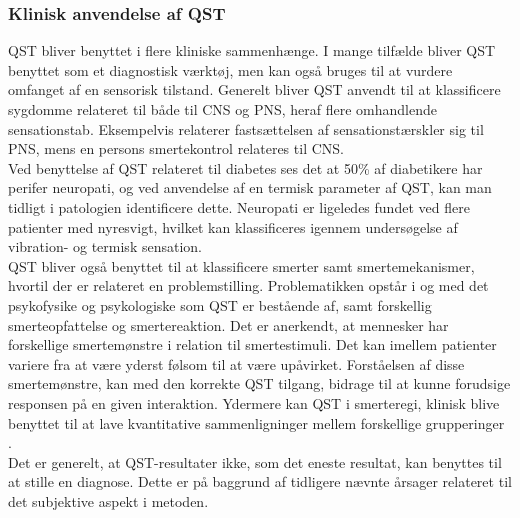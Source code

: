 \subsubsection{Klinisk anvendelse af QST}
QST bliver benyttet i flere kliniske sammenhænge. I mange tilfælde bliver QST benyttet som et diagnostisk værktøj, men kan også bruges til at vurdere omfanget af en sensorisk tilstand. Generelt bliver QST anvendt til at klassificere sygdomme relateret til både til CNS og PNS, heraf flere omhandlende sensationstab. Eksempelvis relaterer fastsættelsen af sensationstærskler sig til PNS, mens en persons smertekontrol relateres til CNS. \\ 
Ved benyttelse af QST relateret til diabetes ses det at 50\% af diabetikere har perifer neuropati, og ved anvendelse af en termisk parameter af QST, kan man tidligt i patologien identificere dette. Neuropati er ligeledes fundet ved flere patienter med nyresvigt, hvilket kan klassificeres igennem undersøgelse af vibration- og termisk sensation. \citep{Yarnitsky1997} \citep{Yarnitsky2006} \\
QST bliver også benyttet til at klassificere smerter samt smertemekanismer, hvortil der er relateret en problemstilling. Problematikken opstår i og med det psykofysike og psykologiske som QST er bestående af, samt forskellig smerteopfattelse og smertereaktion. \citep{Yarnitsky1997} Det er anerkendt, at mennesker har forskellige smertemønstre i relation til smertestimuli. Det kan imellem patienter variere fra at være yderst følsom til at være upåvirket. Forståelsen af disse smertemønstre, kan med den korrekte QST tilgang, bidrage til at kunne forudsige responsen på en given interaktion. \citep{Yarnitsky2006} Ydermere kan QST i smerteregi, klinisk blive benyttet til at lave kvantitative sammenligninger mellem forskellige grupperinger \citep{Arendt-Nielsen2009}. \\
Det er generelt, at QST-resultater ikke, som det eneste resultat, kan benyttes til at stille en diagnose. Dette er på baggrund af tidligere nævnte årsager relateret til det subjektive aspekt i metoden. \citep{Yarnitsky2006}

